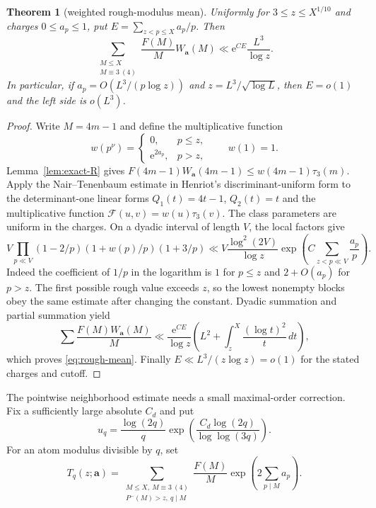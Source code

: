 \documentclass[10pt,reqno]{amsart}
\newtheorem{theorem}{Theorem}[section]
\theoremstyle{definition}
\newcommand{\e}{\mathrm e}
\newcommand{\1}{\mathbf 1}
\begin{document}
\begin{theorem}[weighted rough-modulus mean]\label{thm:rough-mean}
Uniformly for $3\leq z\leq X^{1/10}$ and charges $0\leq a_p\leq1$, put
$E=\sum_{z<p\leq X}a_p/p$.  Then
\begin{equation}\label{eq:rough-mean}
 \sum_{\substack{M\leq X\\M\equiv3\ (4)}}
 \frac{F(M)}M W_{\boldsymbol a}(M)
 \ll \e^{CE}\frac{L^3}{\log z}.
\end{equation}
In particular, if $a_p=O(L^3/(p\log z))$ and
$z=L^3/\sqrt{\log L}$, then $E=o(1)$ and the left side is $o(L^3)$.
\end{theorem}
\begin{proof}
Write $M=4m-1$ and define the multiplicative function
\[
 w(p^\nu)=\begin{cases}0,&p\leq z,\\ \e^{2a_p},&p>z,
 \end{cases}\qquad w(1)=1.
\]
Lemma~\ref{lem:exact-R} gives
$F(4m-1)W_{\boldsymbol a}(4m-1)\leq w(4m-1)\tau_3(m)$.
Apply the Nair--Tenenbaum estimate in Henriot's discriminant-uniform form \cite{NairTenenbaum,Henriot} to the determinant-one linear forms
$Q_1(t)=4t-1$, $Q_2(t)=t$ and the multiplicative function
$\mathcal F(u,v)=w(u)\tau_3(v)$.  The class parameters are uniform in the charges.  On a dyadic interval of length $V$, the local factors give
\[
 V\prod_{p\ll V}(1-2/p)(1+w(p)/p)(1+3/p)
 \ll V\frac{\log^2(2V)}{\log z}
 \exp\!\left(C\sum_{z<p\ll V}\frac{a_p}p\right).
\]
Indeed the coefficient of $1/p$ in the logarithm is $1$ for $p\leq z$ and $2+O(a_p)$ for $p>z$.  The first possible rough value exceeds $z$, so the lowest nonempty blocks obey the same estimate after changing the constant.  Dyadic summation and partial summation yield
\[
 \sum\frac{F(M)W_{\boldsymbol a}(M)}M
 \ll\frac{\e^{CE}}{\log z}
 \left(L^2+\int_z^X\frac{(\log t)^2}{t}\,dt\right),
\]
which proves \eqref{eq:rough-mean}.  Finally
$E\ll L^3/(z\log z)=o(1)$ for the stated charges and cutoff.
\end{proof}

The pointwise neighborhood estimate needs a small maximal-order correction.  Fix a sufficiently large absolute $C_d$ and put
\[
 u_q=\frac{\log(2q)}q
 \exp\!\left(\frac{C_d\log(2q)}{\log\log(3q)}\right).
\]
For an atom modulus divisible by $q$, set
\[
 T_q(z;\boldsymbol a)=
 \sum_{\substack{M\leq X,\ M\equiv3\ (4)\\P^-(M)>z,\ q\mid M}}
 \frac{F(M)}M\exp\!\left(2\sum_{p\mid M}a_p\right).
\]
\end{document}
